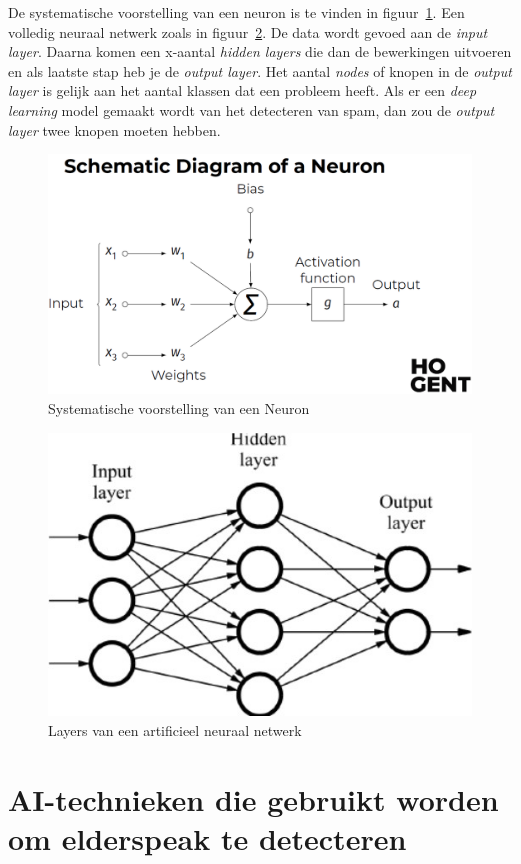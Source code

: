 {De systematische voorstelling van een neuron is te vinden in figuur~\ref{fig:neuron}.
Een volledig neuraal netwerk zoals in figuur~\ref{fig:layers}. De data wordt gevoed aan de \textit{input layer}. Daarna komen een x-aantal \textit{hidden layers} die dan de bewerkingen uitvoeren en als laatste stap heb je de \textit{output layer}. Het aantal \textit{nodes} of knopen in de \textit{output layer} is gelijk aan het aantal klassen dat een probleem heeft. Als er een \textit{deep learning} model gemaakt wordt van het detecteren van spam, dan zou de \textit{output layer} twee knopen moeten hebben.

\begin{figure}
    \centering
    \includegraphics[width=1\textwidth]{./img/neuron}
    \caption{\label{fig:neuron} Systematische voorstelling van een Neuron~\autocite{Lievens2021}}
\end{figure}

\begin{figure}
    \centering
    \includegraphics[width=.5\textwidth]{./img/layers}
    \caption{\label{fig:layers} Layers van een artificieel neuraal netwerk~\autocite{Lievens2021}}
\end{figure}


\section{AI-technieken die gebruikt worden om elderspeak te detecteren}

}
